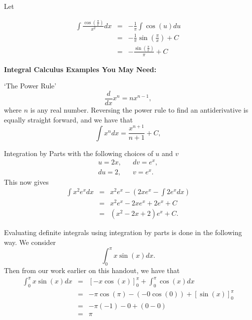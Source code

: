 \documentclass[12pt,a4paper,anypage]{report}
\newcounter{questionnumber}
\newcounter{myenumeratecounter}
\newenvironment{question}[1]{\addtocounter{questionnumber}{1}{{\bf\thequestionnumber}) {\em{#1}}\setcounter{myenumeratecounter}{0}}}{}
\begin{document}
\begin{question}{}
Let 

\begin{eqnarray*}
  \int{\frac{\cos\left(\frac{\pi}{x}\right)}{x^2}dx} &=& -\frac{1}{\pi}\int{\cos(u)du}\\
                                                     &=&-\frac{1}{\pi}\sin\left(\frac{\pi}{x}\right)+C\\
                                                     &=&-\frac{\sin\left(\frac{\pi}{x}\right)}{\pi}+C
\end{eqnarray*}

\end{question}

\begin{question}{}

\end{question}

{\bf Integral Calculus Examples You May Need:}

`The Power Rule'
\[
\frac{d}{dx}x^n = nx^{n-1},
\]
where $n$ is any real number. Reversing the power rule to find an antiderivative is equally straight forward, and we have that
\[
\int x^n dx= \frac{x^{n+1}}{n+1} + C,
\]

Integration by Parts with the following choices of $u$ and $v$
\begin{eqnarray*}
  u = 2x, &&dv=e^x,\\
  du=2,&&v=e^x.
\end{eqnarray*}
This now gives
\begin{eqnarray*}
  \int x^2e^xdx&=&x^2e^x - \left(2xe^x - \int 2e^xdx \right)\\
  &=&x^2e^x-2xe^x+2e^x + C\\
  &=&(x^2-2x+2)e^x+C.
\end{eqnarray*}

Evaluating definite integrals using integration by parts is done in the following way. We consider
\[
\int_0^\pi x\sin(x)dx.
\]
Then from our work earlier on this handout, we have that
\begin{eqnarray*}
  \int_0^\pi x\sin(x)dx &=&\left[-x\cos(x)\right]^\pi_0 + \int_0^\pi \cos(x)dx \\
  &=&-\pi\cos(\pi) - ( -0\cos(0)) + [\sin(x)]_0^\pi\\
  &=&-\pi(-1) - 0 + (0-0)\\
  &=&\pi
\end{eqnarray*}
\end{document}
